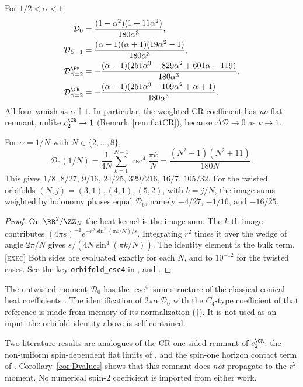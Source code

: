 \begin{corollary}
\label{cor:Dvalues}
For \(1/2<\alpha<1\):
\begin{align*}
\mathcal D_0&=\frac{(1-\alpha^2)(1+11\alpha^2)}{180\alpha^3},\\
\mathcal D_{S=1}&=\frac{(\alpha-1)(\alpha+1)(19\alpha^2-1)}{180\alpha^3},\\
\mathcal D^\Fr_{S=2}&=-\frac{(\alpha-1)(251\alpha^3-829\alpha^2+601\alpha-119)}{180\alpha^3},\\
\mathcal D^\CR_{S=2}&=-\frac{(\alpha-1)(251\alpha^3-109\alpha^2+\alpha+1)}{180\alpha^3}.
\end{align*}
All four vanish as \(\alpha\uparrow1\).
In particular, the weighted CR coefficient has \emph{no} flat
remnant, unlike \(c_2^\CR\to1\) (Remark~\ref{rem:flatCR}),
because \(\Delta\mathcal D\to0\) as \(\nu\to1\).
\end{corollary}

\begin{proposition}
\label{prop:orbifold}
For \(\alpha=1/N\) with \(N\in\{2,\dots,8\}\),
\[
\mathcal D_0(1/N)=\frac1{4N}\sum_{k=1}^{N-1}\csc^4\frac{\pi k}{N}
=\frac{(N^2-1)(N^2+11)}{180N}.
\]
This gives \(1/8,\,8/27,\,9/16,\,24/25,\,329/216,\,16/7,\,105/32\).
For the twisted orbifolds \((N,j)=(3,1),(4,1),(5,2)\), with
\(b=j/N\), the image sums weighted by holonomy phases equal
\(\mathcal D_b\), namely \(-4/27\), \(-1/16\), and \(-16/25\).
\end{proposition}

\begin{proof}
On \(\RR^2/\ZZ_N\) the heat kernel is the image sum.
The \(k\)-th image contributes
\((4\pi s)^{-1}e^{-r^2\sin^2(\pi k/N)/s}\).
Integrating \(r^2\) times it over the wedge of angle \(2\pi/N\) gives
\(s/(4N\sin^4(\pi k/N))\).
The identity element is the bulk term.
\textsc{[exec]} Both sides are evaluated exactly for each \(N\),
and to \(10^{-12}\) for the twisted cases.
See the key \texttt{orbifold\_csc4} in
, and
.
\end{proof}

\begin{remark}
The untwisted moment \(\mathcal D_0\) has the
\(\csc^4\)-sum structure of the classical conical heat coefficients
\cite{Fursaev1994}.
The identification of \(2\pi\alpha\,\mathcal D_0\) with the
\(C_4\)-type coefficient of that reference is made from memory of its
normalization (\(\dagger\)). It is not used as an input: the
orbifold identity above is self-contained.

Two literature results are analogues of the CR one-sided remnant
of \(c_2^\CR\): the non-uniform spin-dependent flat limits of
\cite{FursaevMiele1997}, and the spin-one horizon contact term of
\cite{Kabat}.
Corollary~\ref{cor:Dvalues} shows that this remnant does
\emph{not} propagate to the \(r^2\) moment.
No numerical spin-2 coefficient is imported from either work.
\end{remark}

